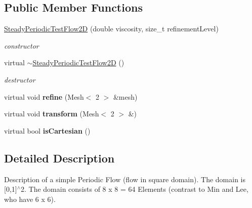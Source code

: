 \subsection*{Public Member Functions}
\begin{DoxyCompactItemize}
\item 
\hyperlink{classSteadyPeriodicTestFlow2D_ab5920c3efd71be68da68c87745f98c28}{SteadyPeriodicTestFlow2D} (double viscosity, size\_\-t refinementLevel)
\begin{DoxyCompactList}\small\item\em constructor \item\end{DoxyCompactList}\item 
\hypertarget{classSteadyPeriodicTestFlow2D_a07b6c5b3cba87a6c2355e4a98e2d7d49}{
virtual \hyperlink{classSteadyPeriodicTestFlow2D_a07b6c5b3cba87a6c2355e4a98e2d7d49}{$\sim$SteadyPeriodicTestFlow2D} ()}
\label{classSteadyPeriodicTestFlow2D_a07b6c5b3cba87a6c2355e4a98e2d7d49}

\begin{DoxyCompactList}\small\item\em destructor \item\end{DoxyCompactList}\item 
\hypertarget{classSteadyPeriodicTestFlow2D_a1ebba67e654cd7000225e59e40f997dc}{
virtual void {\bfseries refine} (Mesh$<$ 2 $>$ \&mesh)}
\label{classSteadyPeriodicTestFlow2D_a1ebba67e654cd7000225e59e40f997dc}

\item 
\hypertarget{classSteadyPeriodicTestFlow2D_a4cc5e982c3e4449841ea15bdfb79d394}{
virtual void {\bfseries transform} (Mesh$<$ 2 $>$ \&)}
\label{classSteadyPeriodicTestFlow2D_a4cc5e982c3e4449841ea15bdfb79d394}

\item 
\hypertarget{classSteadyPeriodicTestFlow2D_a6dce4a1de192e75c2e475f647152fb01}{
virtual bool {\bfseries isCartesian} ()}
\label{classSteadyPeriodicTestFlow2D_a6dce4a1de192e75c2e475f647152fb01}

\end{DoxyCompactItemize}


\subsection{Detailed Description}
Description of a simple Periodic Flow (flow in square domain). The domain is \mbox{[}0,1\mbox{]}$^\wedge$2. The domain consists of 8 x 8 = 64 Elements (contrast to Min and Lee, who have 6 x 6). 

